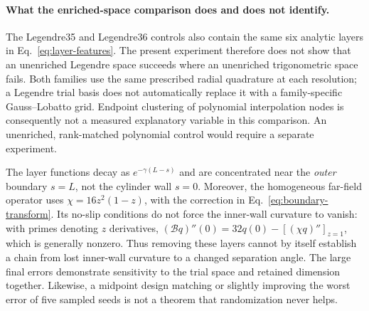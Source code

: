 \paragraph{What the enriched-space comparison does and does not identify.}
The Legendre35 and Legendre36 controls also contain the same six analytic
layers in Eq.~\eqref{eq:layer-features}. The present experiment therefore does
not show that an unenriched Legendre space succeeds where an unenriched
trigonometric space fails. Both families use the same prescribed radial
quadrature at each resolution; a Legendre trial basis does not automatically
replace it with a family-specific Gauss--Lobatto grid. Endpoint clustering of
polynomial interpolation nodes is consequently not a measured explanatory
variable in this comparison. An unenriched, rank-matched polynomial control
would require a separate experiment.

The layer functions decay as $e^{-\gamma(L-s)}$ and are concentrated near the
\emph{outer} boundary $s=L$, not the cylinder wall $s=0$. Moreover, the
homogeneous far-field operator uses $\chi=16z^2(1-z)$, with the correction in
Eq.~\eqref{eq:boundary-transform}. Its no-slip conditions do not force the
inner-wall curvature to vanish: with primes denoting $z$ derivatives,
$(\mathcal Bq)''(0)=32q(0)-[(\chi q)'']_{z=1}$, which is generally nonzero.
Thus removing these layers cannot by itself establish a chain from lost
inner-wall curvature to a changed separation angle. The large final errors
demonstrate sensitivity to the trial space and retained dimension together.
Likewise, a midpoint design matching or slightly improving the worst error
of five sampled seeds is not a theorem that randomization never helps.
